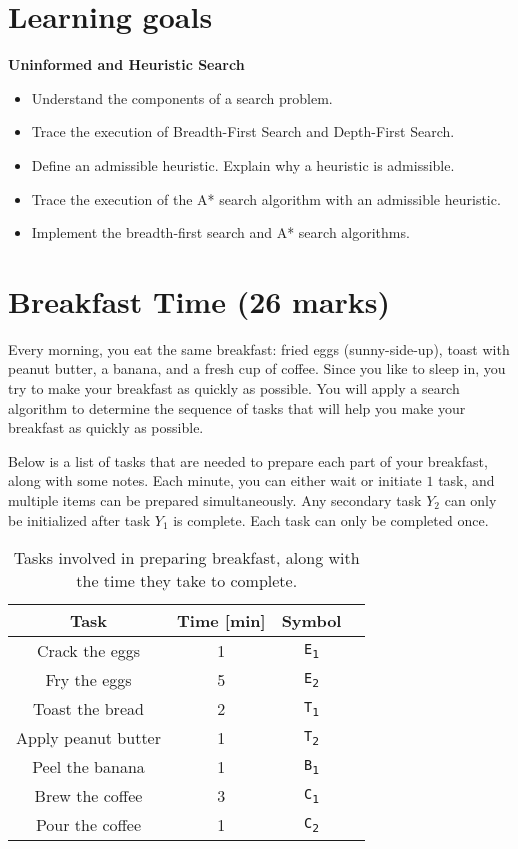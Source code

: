 \documentclass[12pt]{article}
\begin{document}
\section*{Learning goals}

{\bf Uninformed and Heuristic Search}
\begin{itemize}
\item Understand the components of a search problem.
\item Trace the execution of Breadth-First Search and Depth-First Search.
\item Define an admissible heuristic. Explain why a heuristic is admissible.
\item Trace the execution of the A* search algorithm with an admissible heuristic.
\item Implement the breadth-first search and A* search algorithms.
\end{itemize}




\newpage
\section{Breakfast Time (26 marks)}

Every morning, you eat the same breakfast: fried eggs (sunny-side-up), toast with peanut butter, a banana, and a fresh cup of coffee. Since you like to sleep in, you try to make your breakfast as quickly as possible. You will apply a search algorithm to determine the sequence of tasks that will help you make your breakfast as quickly as possible.

Below is a list of tasks that are needed to prepare each part of your breakfast, along with some notes. Each minute, you can either wait or initiate $1$ task, and multiple items can be prepared simultaneously. Any secondary task $Y_2$ can only be initialized after task $Y_1$ is complete. Each task can only be completed once.

\begin{table}[ht!]
    \centering
    \begin{tabular}{cccc}
        \toprule
        Task & Time [min] & Symbol \\
        \midrule
        Crack the eggs  & 1 & \texttt{E\textsubscript{1}} \\
        Fry the eggs &  5 & \texttt{E\textsubscript{2}} \\
        Toast the bread & 2 & \texttt{T\textsubscript{1}}\\
        Apply peanut butter & 1 & \texttt{T\textsubscript{2}} \\
        Peel the banana &  1 & \texttt{B\textsubscript{1}}\\
        Brew the coffee &  3 & \texttt{C\textsubscript{1}}\\
        Pour the coffee & 1 & \texttt{C\textsubscript{2}} \\
        \bottomrule
    \end{tabular}
    \label{tab:breakfast-actions}
    \caption{Tasks involved in preparing breakfast, along with the time they take to complete.}
\end{table}
\end{document}
